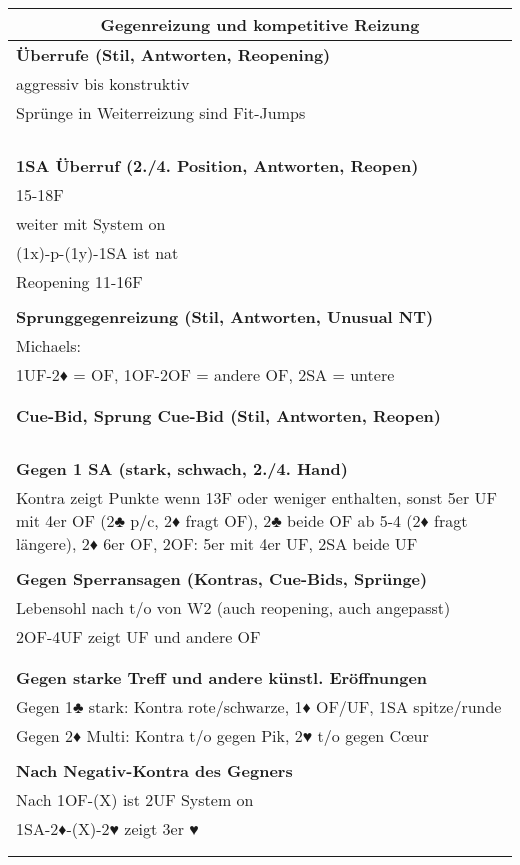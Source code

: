 \documentclass{article}
\begin{document}
\begin{multicols}{3}
\raggedcolumns

\begin{tabularx}{\columnwidth}{|X|}
\hline \multicolumn{1}{|c|}{\bf \large Gegenreizung und kompetitive Reizung} \\
\hline \bf Überrufe (Stil, Antworten, Reopening) \\
 aggressiv bis konstruktiv \\
 Sprünge in Weiterreizung sind Fit-Jumps \\
\\
\\
\\
\\
\hline \bf 1SA Überruf (2./4. Position, Antworten, Reopen) \\
 15-18F \\
 weiter mit System on \\
 (1x)-p-(1y)-1SA ist nat \\
 Reopening 11-16F\\
\\
\hline \bf Sprunggegenreizung (Stil, Antworten, Unusual NT) \\
 Michaels: \\
 1UF-2♦ = OF, 1OF-2OF = andere OF, 2SA = untere \\
\\
\\
\hline \bf Cue-Bid, Sprung Cue-Bid (Stil, Antworten, Reopen) \\
\\
\\
\\
\\
\hline \bf Gegen 1 SA (stark, schwach, 2./4. Hand) \\
\hline Kontra zeigt Punkte wenn 13F oder weniger enthalten, sonst 5er UF mit 4er OF (2♣ p/c, 2♦ fragt OF), 2♣ beide OF ab 5-4 (2♦ fragt längere), 2♦ 6er OF, 2OF: 5er mit 4er UF, 2SA beide UF \\
\\
\hline \bf Gegen Sperransagen (Kontras, Cue-Bids, Sprünge) \\
\hline Lebensohl nach t/o von W2 (auch reopening, auch angepasst)\\
2OF-4UF zeigt UF und andere OF\\
\\
\\
\hline \bf Gegen starke Treff und andere künstl. Eröffnungen \\
\hline Gegen 1♣ stark: Kontra rote/schwarze, 1♦ OF/UF, 1SA spitze/runde\\
Gegen 2♦ Multi: Kontra t/o gegen Pik, 2♥ t/o gegen C\oe{}ur\\
\\
\hline \bf Nach Negativ-Kontra des Gegners \\
 Nach 1OF-(X) ist 2UF System on \\
 1SA-2♦-(X)-2♥ zeigt 3er ♥ \\
\\
\\
\hline \end{tabularx}


\end{multicols}
\end{document}
